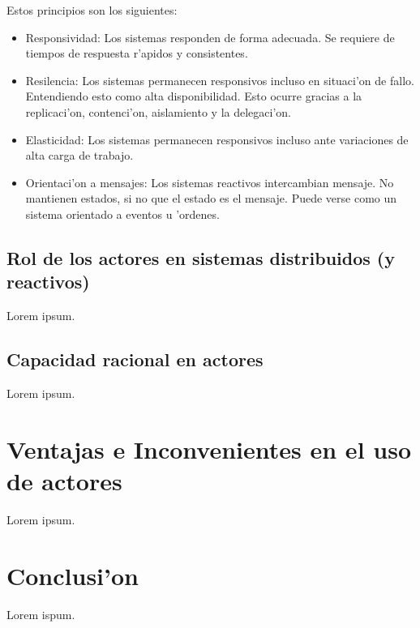 \documentclass[12pt]{article}
\begin{document}
Estos principios son los siguientes:

\begin{itemize}
	\item Responsividad: Los sistemas responden de forma adecuada. Se requiere de tiempos
    de respuesta r'apidos y consistentes.
	\item Resilencia: Los sistemas permanecen responsivos incluso en situaci'on de fallo.
    Entendiendo esto como alta disponibilidad. Esto ocurre gracias a la replicaci'on, contenci'on,
    aislamiento y la delegaci'on.
	\item Elasticidad: Los sistemas permanecen responsivos incluso ante variaciones de alta
    carga de trabajo.
	\item Orientaci'on a mensajes: Los sistemas reactivos intercambian mensaje. No mantienen estados,
    si no que el estado es el mensaje. Puede verse como un sistema orientado a eventos u 'ordenes.
\end{itemize}

\subsection{Rol de los actores en sistemas distribuidos (y reactivos)}
\label{sub:rol de los actores en sistemas distribuidos y reactivos}
Lorem ipsum.
\subsection{Capacidad racional en actores}
\label{sub:capacidad racional en actores}
Lorem ipsum.
\section{Ventajas e Inconvenientes en el uso de actores}
\label{sec:ventajas e inconvenientes}
Lorem ipsum.
\section{Conclusi'on}
Lorem ispum.

\printbibliography
\end{document}

